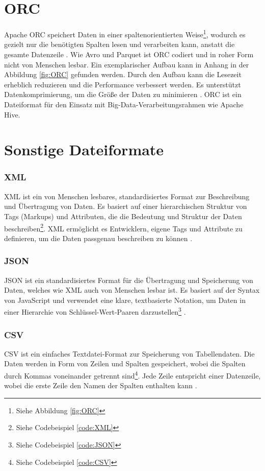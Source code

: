 \section{ORC}
Apache \ac{ORC} speichert Daten in einer spaltenorientierten Weise\footnote{Siehe Abbildung \ref{fig:ORC}}, wodurch es gezielt nur die benötigten Spalten lesen und verarbeiten kann, anstatt die gesamte Datenzeile \cite[S. 339]{munir_cost-based_2020} \cite{apache_languagemanual_nodate} \cite[S. 906]{gohil_compendious_2022}. Wie Avro und Parquet ist ORC codiert und in roher Form nicht von Menschen lesbar. Ein exemplarischer Aufbau kann in Anhang in der Abbildung \ref{fig:ORC} gefunden werden. Durch den Aufbau kann die Lesezeit erheblich reduzieren und die Performance verbessert werden. Es unterstützt Datenkomprimierung, um die Größe der Daten zu minimieren \cite[S. 268]{plase_comparison_2017}. ORC ist ein Dateiformat für den Einsatz mit Big-Data-Verarbeitungsrahmen wie Apache Hive. 

\section{Sonstige Dateiformate}
\subsubsection{XML}
\ac{XML} ist ein von Menschen lesbares, standardisiertes Format zur Beschreibung und Übertragung von Daten. Es basiert auf einer hierarchischen Struktur von Tags (Markups) und Attributen, die die Bedeutung und Struktur der Daten beschreiben\footnote{Siehe Codebeispiel \ref{code:XML}}. XML ermöglicht es Entwicklern, eigene Tags und Attribute zu definieren, um die Daten passgenau beschreiben zu können \cite[S. 7ff.]{nolan_xml_2014} \cite[S. 906]{gohil_compendious_2022}.

\subsubsection{JSON}
\ac{JSON} ist ein standardisiertes Format für die Übertragung und Speicherung von Daten, welches wie XML auch von Menschen lesbar ist. Es basiert auf der Syntax von JavaScript und verwendet eine klare, textbasierte Notation, um Daten in einer Hierarchie von Schlüssel-Wert-Paaren darzustellen\footnote{Siehe Codebeispiel \ref{code:JSON}} \cite[S. 4]{belov_experimental_2021} \cite[S. 14ff.]{nolan_xml_2014} \cite[S. 906]{gohil_compendious_2022}.

\subsubsection{CSV}
\ac{CSV} ist ein einfaches Textdatei-Format zur Speicherung von Tabellendaten. Die Daten werden in Form von Zeilen und Spalten gespeichert, wobei die Spalten durch Kommas voneinander getrennt sind\footnote{Siehe Codebeispiel \ref{code:CSV}}. Jede Zeile entspricht einer Datenzeile, wobei die erste Zeile den Namen der Spalten enthalten kann \cite[S. 905]{gohil_compendious_2022}.
